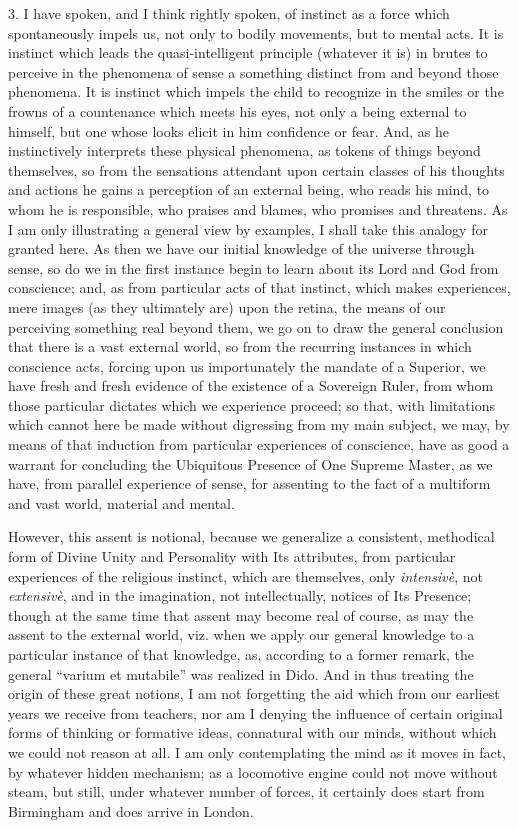 3. I have spoken, and I think rightly spoken, of instinct as a
force which spontaneously impels us, not only to bodily movements, but
to mental acts. It is instinct which leads the quasi-intelligent
principle (whatever it is) in brutes to perceive in the phenomena of
sense a something distinct from and beyond those phenomena. It is
instinct which impels the child to recognize in the smiles or the
frowns of a countenance which meets his eyes, not only a being
external to himself, but one whose looks elicit in him confidence or
fear. And, as he instinctively interprets these physical phenomena, as
tokens of things beyond themselves, so from the sensations attendant
upon certain classes of his thoughts and actions he gains a perception
of an external being, who reads his mind, to whom he is responsible,
who praises and blames, who promises and threatens. As I am only illustrating a general view by examples, I shall take this analogy for
granted here. As then we have our initial knowledge of the universe
through sense, so do we in the first instance begin to learn about its
Lord and God from conscience; and, as from particular acts of that
instinct, which makes experiences, mere images (as they ultimately
are) upon the retina, the means of our perceiving something real
beyond them, we go on to draw the general conclusion that there is a
vast external world, so from the recurring instances in which
conscience acts, forcing upon us importunately the mandate of a
Superior, we have fresh and fresh evidence of the existence of a
Sovereign Ruler, from whom those particular dictates which we
experience proceed; so that, with limitations which cannot here be
made without digressing from my main subject, we may, by means of that
induction from particular experiences of conscience, have as good a
warrant for concluding the Ubiquitous Presence of One Supreme Master,
as we have, from parallel experience of sense, for assenting to the
fact of a multiform and vast world, material and mental.

However, this assent is notional, because we generalize a
consistent, methodical form of Divine Unity and Personality with Its
attributes, from particular experiences of the religious instinct,
which are themselves, only \emph{intensivè}, not \emph{extensivè},
and in the imagination, not intellectually, notices of Its Presence;
though at the same time that assent may become real of course, as may
the assent to the external world, viz. when we apply our general
knowledge to a particular instance of that knowledge, as, according to
a former remark, the general ``varium et mutabile'' was
realized in Dido. And in thus treating the origin of these great
notions, I am not forgetting the aid which from our earliest years we
receive from teachers, nor am I denying the influence of certain
original forms of thinking or formative ideas, connatural with our
minds, without which we could not reason at all. I am only
contemplating the mind as it moves in fact, by whatever hidden
mechanism; as a locomotive engine could not move without steam, but
still, under whatever number of forces, it certainly does start from
Birmingham and does arrive in London.

